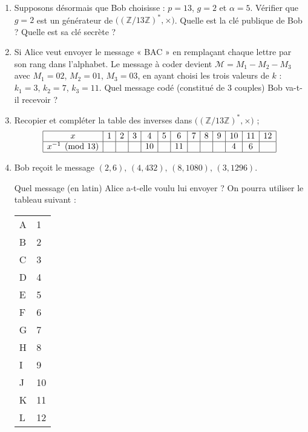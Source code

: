 {{\begin{enumerate}
    \item Supposons désormais que Bob choisisse : $p = 13$, $g = 2$ et $\alpha = 5$. Vérifier que $g = 2$ est un générateur de $\big((\mathbb{Z}/13\mathbb{Z})^{\ast}, \times \big)$. Quelle est la clé publique de Bob ? Quelle est sa clé secrète ?
    
    \item Si Alice veut envoyer le message « BAC » en remplaçant chaque lettre par son rang dans l’alphabet. Le message à coder devient $\mathcal{M}=M_1-M_2-M_3$ avec $M_1 = 02$, $M_2 = 01$, $M_3 = 03$, en ayant choisi les trois valeurs de $k$ : $k_1 = 3$, $k_2 = 7$, $k_3 = 11$. Quel message codé (constitué de 3 couples) Bob va-t-il recevoir ?

\item Recopier et compléter la table des inverses dans $\big((\mathbb{Z}/13\mathbb{Z})^{\ast}, \times \big)$ ;
\[
\begin{array}{|c|c|c|c|c|c|c|c|c|c|c|c|c|}
\hline
x & 1 & 2 & 3 & 4 & 5 & 6 & 7 & 8 & 9 & 10 & 11 & 12 \\
\hline
x^{-1} \pmod{13} &  &  &  & 10 & & 11 & &  & & 4 & 6 &  \\
\hline
\end{array}
\]
\item Bob reçoit le message $(2, 6), \, (4, 432), \, (8, 1080), \, (3, 1296).$

Quel message (en latin) Alice a-t-elle voulu lui envoyer ? On pourra utiliser le tableau suivant :

\begin{center}
\begin{tabular}{l|l}
A & 1 \\
B & 2 \\
C & 3 \\
D & 4 \\
E & 5 \\
F & 6 \\
G & 7 \\
H & 8 \\
I & 9 \\
J & 10 \\
K & 11 \\
L & 12 \\
\end{tabular}
\end{center}
















\end{enumerate}

}
}